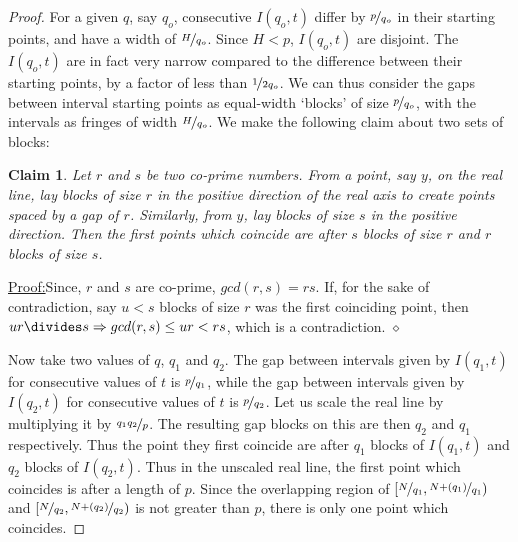 \documentclass{report}
\newtheorem*{claim*}{Claim}
\newenvironment{claimproof}[1]{\par\noindent\underline{Proof:}\space#1}{\hfill $\diamond$ \vspace{3mm} \par}
\newcommand{\ignore}[1]{}
\begin{document}
\begin{proof}
For a given $q$, say $q_o$, consecutive $I(q_o,t)$ differ by $\nicefrac{p}{q_o}$ in their starting points, and have a width of $\nicefrac{H}{q_o}$. Since $H<p$, $I(q_o,t)$ are disjoint. The $I(q_o,t)$ are in fact very narrow compared to the difference between their starting points, by a factor of less than $\nicefrac{1}{2q_o}$. We can thus consider the gaps between interval starting points as equal-width `blocks' of size $\nicefrac{p}{q_o}$, with the intervals as fringes of width $\nicefrac{H}{q_o}$. We make the following claim about two sets of blocks:
%
\begin{claim*}
  Let $r$ and $s$ be two co-prime numbers. From a point, say $y$, on the real line, lay blocks of size $r$ in the positive direction of the real axis to create points spaced by a gap of $r$. Similarly, from $y$, lay blocks of size $s$ in the positive direction. Then the first points which coincide are after $s$ blocks of size $r$ and $r$ blocks of size $s$.
\end{claim*}
\begin{claimproof}
  Since, $r$ and $s$ are co-prime, $gcd(r,s)=rs$. If, for the sake of contradiction, say $u<s$ blocks of size $r$ was the first coinciding point, then $ur\divides s\Rightarrow gcd(r,s) \leq ur < rs$, which is a contradiction.
\end{claimproof}
%
Now take two values of $q$, $q_1$ and $q_2$. The gap between intervals \ignore {clarify convention earlier} given by $I(q_1,t)$ for consecutive values of $t$ is $\nicefrac{p}{q_1}$, while the gap between intervals given by $I(q_2,t)$ for consecutive values of $t$ is $\nicefrac{p}{q_2}$. Let us scale the real line by multiplying it by $\nicefrac{q_1q_2}{p}$. The resulting gap blocks on this are then $q_2$ and $q_1$ respectively. Thus the point they first coincide are after $q_1$ blocks of $I(q_1,t)$ and $q_2$ blocks of $I(q_2,t)$. Thus in the unscaled real line, the first point which coincides is after a length of $p$. Since the overlapping region of $[\nicefrac{N}{q_1},\nicefrac{N+(q_1)}{q_1})$ and $[\nicefrac{N}{q_2},\nicefrac{N+(q_2)}{q_2})$ is not greater than $p$, there is only one point which coincides.


\end{proof}
\end{document}
